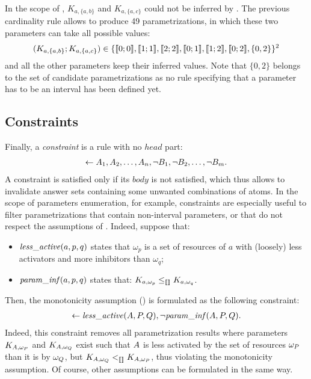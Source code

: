 \begin{example}\label{ex:cardinality}
In the scope of , $K_{a,\{a,b\}}$ and $K_{a,\{a,c\}}$ could not be inferred by .
The previous cardinality rule allows to produce 49 parametrizations, in which these two parameters can take all possible values:
\begin{align*}
  (K_{a,\{a,b\}} ; K_{a,\{a,c\}}) \in \{ \llbracket 0 ; 0 \rrbracket , \llbracket 1 ; 1 \rrbracket , \llbracket 2 ; 2 \rrbracket , \llbracket 0 ; 1 \rrbracket , \llbracket 1 ; 2 \rrbracket , \llbracket 0 ; 2 \rrbracket, \{ 0, 2 \} \}^2
\end{align*}
and all the other parameters keep their inferred values.
Note that $\{ 0, 2 \}$ belongs to the set of candidate parametrizations
as no rule specifying that a parameter has to be an interval has been defined yet.
\end{example}



\subsection{Constraints}\label{sssec:constraints}
Finally, a \emph{constraint} is a rule with no $head$ part:
\begin{align*}
  \leftarrow A_1, A_2, \dots, A_n, \neg B_1, \neg B_2, \dots, \neg B_m.
\end{align*}
A constraint is satisfied only if its $body$ is not satisfied,
which thus allows to invalidate answer sets containing some unwanted combinations of atoms.
In the scope of parameters enumeration, for example, constraints are especially useful to filter parametrizations
that contain non-interval parameters, or that do not respect the assumptions of .
Indeed, suppose that:
\begin{itemize}
  \item $\mathit{less\_active}(a, p, q)$ states that $\omega_p$ is a set of resources of $a$ with (loosely) less activators and more inhibitors than $\omega_q$;
  \item $\mathit{param\_inf}(a, p, q)$ states that: $K_{a,\omega_p} \leq_{\llbracket\rrbracket} K_{a,\omega_q}$.
\end{itemize}
Then, the monotonicity assumption () is formulated as the following constraint:
\begin{align*}
  \leftarrow \mathit{less\_active}(A, P, Q), \neg \mathit{param\_inf}(A, P, Q).
\end{align*}
Indeed, this constraint removes all parametrization results where parameters $K_{A,\omega_P}$ and $K_{A,\omega_Q}$ exist
such that $A$ is less activated by the set of resources $\omega_P$ than it is by $\omega_Q$,
but $K_{A,\omega_Q} <_{\llbracket\rrbracket} K_{A,\omega_P}$,
thus violating the monotonicity assumption.
Of course, other assumptions can be formulated in the same way.

